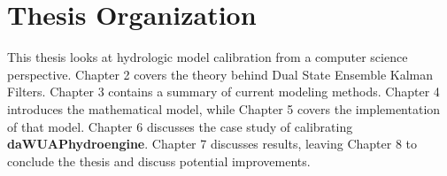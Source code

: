 \section{Thesis Organization}

This thesis looks at hydrologic model calibration from a computer science perspective. Chapter 2 covers the theory behind Dual State Ensemble Kalman Filters. Chapter 3 contains a summary of current modeling methods. Chapter 4 introduces the mathematical model, while Chapter 5 covers the implementation of that model. Chapter 6 discusses the case study of calibrating \textbf{daWUAPhydroengine}. Chapter 7 discusses results, leaving Chapter 8 to conclude the thesis and discuss potential improvements.



